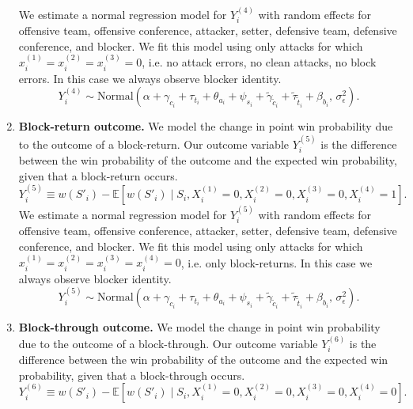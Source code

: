 \documentclass{article}
\begin{document}
\begin{enumerate}
        We estimate a normal regression model for $Y_i^{(4)}$ with random effects for offensive team, offensive conference, attacker, setter, defensive team, defensive conference, and blocker. We fit this model using only attacks for which $x_i^{(1)} = x_i^{(2)} = x_i^{(3)} = 0$, i.e. no attack errors, no clean attacks, no block errors. In this case we always observe blocker identity.
        \begin{equation}
        \label{eqn:attack-model-4}
            Y_i^{(4)} \sim \mbox{Normal}\left(
                \alpha + \gamma_{c_i} + \tau_{t_i} + \theta_{a_i} + \psi_{s_i} + \tilde\gamma_{\tilde c_i} + \tilde\tau_{\tilde t_i} + \beta_{b_i},\,
                \sigma^2_\epsilon
            \right).
        \end{equation}
    \item
        {\bf Block-return outcome.} We model the change in point win probability due to the outcome of a block-return. Our outcome variable $Y_i^{(5)}$ is the difference between the win probability of the outcome and the expected win probability, given that a block-return occurs.
        \begin{equation*}
            Y_i^{(5)} \equiv w(S'_i) - \mathbb{E}\left[w(S'_i) \mid S_i, X_i^{(1)} = 0, X_i^{(2)} = 0, X_i^{(3)} = 0, X_i^{(4)} = 1\right].
        \end{equation*}
        We estimate a normal regression model for $Y_i^{(5)}$ with random effects for offensive team, offensive conference, attacker, setter, defensive team, defensive conference, and blocker. We fit this model using only attacks for which $x_i^{(1)} = x_i^{(2)} = x_i^{(3)} = x_i^{(4)} = 0$, i.e. only block-returns. In this case we always observe blocker identity.
        \begin{equation}
        \label{eqn:attack-model-5}
            Y_i^{(5)} \sim \mbox{Normal}\left(
                \alpha + \gamma_{c_i} + \tau_{t_i} + \theta_{a_i} + \psi_{s_i} + \tilde\gamma_{\tilde c_i} + \tilde\tau_{\tilde t_i} + \beta_{b_i},\,
                \sigma^2_\epsilon
            \right).
        \end{equation}
    \item
        {\bf Block-through outcome.} We model the change in point win probability due to the outcome of a block-through. Our outcome variable $Y_i^{(6)}$ is the difference between the win probability of the outcome and the expected win probability, given that a block-through occurs.
        \begin{equation*}
            Y_i^{(6)} \equiv w(S'_i) - \mathbb{E}\left[w(S'_i) \mid S_i, X_i^{(1)} = 0, X_i^{(2)} = 0, X_i^{(3)} = 0, X_i^{(4)} = 0\right].

\end{equation*}
\end{enumerate}
\end{document}
